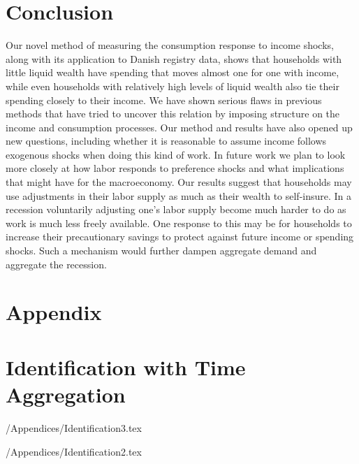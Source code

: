 \documentclass[titlepage]{\econtex}\newcommand{\texname}{IncomeUncertainty}
\begin{document}
\section{Conclusion}
Our novel method of measuring the consumption response to income shocks, along with its application to Danish registry data, shows that households with little liquid wealth have spending that moves almost one for one with income, while even households with relatively high levels of liquid wealth also tie their spending closely to their income. We have shown serious flaws in previous methods that have tried to uncover this relation by imposing structure on the income and consumption processes. Our method and results have also opened up new questions, including whether it is reasonable to assume income follows exogenous shocks when doing this kind of work. In future work we plan to look more closely at how labor responds to preference shocks and what implications that might have for the macroeconomy. Our results suggest that households may use adjustments in their labor supply as much as their wealth to self-insure. In a recession voluntarily adjusting one's labor supply become much harder to do as work is much less freely available. One response to this may be for households to increase their precautionary savings to protect against future income or spending shocks. Such a mechanism would further dampen aggregate demand and aggregate the recession.

\processdelayedfloats

\small

\normalsize

\pagebreak
\appendix

\section*{Appendix}

\section{Identification with Time Aggregation}\label{sec:Identification}

\econtexRoot/Appendices/Identification3.tex

\econtexRoot/Appendices/Identification2.tex

\end{document}
